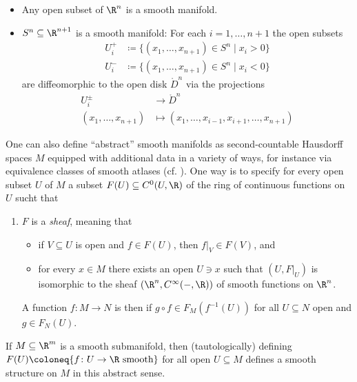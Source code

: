 \begin{example}
	\leavevmode
	\begin{itemize}
		\item Any open subset of $\R^n$ is a smooth manifold.
		\item $S^n \subseteq \R^{n + 1}$ is a smooth manifold:
			For each $i = 1, \ldots, n + 1$ the open subsets 
			\begin{align*}
				U^+_i &\coloneq \{(x_1, \ldots, x_{n + 1}) \in S^n \mid x_i > 0 \} \\
				U^-_i &\coloneq \{(x_1, \ldots, x_{n + 1}) \in S^n \mid x_i < 0 \} 
			\end{align*}
			are diffeomorphic to the open disk $\mathring{D}^n$ via the projections
			\begin{align*}
				U^\pm_i &\to \mathring{D}^n \\
				(x_1, \ldots, x_{n + 1}) &\mapsto (x_1, \ldots, x_{i - 1}, x_{i + 1}, \ldots, x_{n + 1})
			\end{align*}
	\end{itemize}
\end{example}
\begin{remark}
	One can also define \enquote{abstract} smooth manifolds as second-countable Hausdorff spaces $M$ equipped with additional data in a variety of ways, for instance via equivalence classes of smooth atlases (cf. \cite[Ch. 1]{lee_introduction_2012}).
	One way is to specify for every open subset $U$ of $M$ a subset $F(U) \subseteq C^0(U, \R)$ of the ring of continuous functions on $U$ sucht that 
	\begin{enumerate}
		\item $F$ is a \emph{sheaf}, meaning that
			\begin{itemize}
				\item if $V \subseteq U$ is open and $f \in F(U)$, then $f|_V \in F(V)$, and 
				\item for every $x \in M$ there exists an open $U \ni x$ such that $(U, F|_U)$ is isomorphic to the sheaf $(\R^n, C^\infty({{-}}, \R))$ of smooth functions on $\R^n$.
			\end{itemize}
			A function $f\colon M \to N$ is then  if $g \circ f \in F_M(f^{-1}(U))$ for all $U \subseteq N$ open and $g \in F_N(U)$.
	\end{enumerate}
\end{remark}
If $M \subseteq \R^m$ is a smooth submanifold, then (tautologically) defining $F(U) \coloneq \{f\colon U \to \R \text{ smooth}\}$ for all open $U \subseteq M$ defines a smooth structure on $M$ in this abstract sense.
